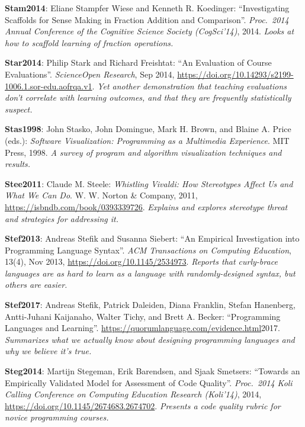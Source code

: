 \textbf{\hypertarget{b:Stam2014}{Stam2014}\label{b:Stam2014}}: Eliane Stampfer Wiese and Kenneth R. Koedinger: ``Investigating Scaffolds for Sense Making in Fraction Addition and Comparison''. \emph{Proc.\ 2014 Annual Conference of the Cognitive Science Society (CogSci'14)}, 2014. \emph{Looks at how to scaffold learning of fraction operations.}

\textbf{\hypertarget{b:Star2014}{Star2014}\label{b:Star2014}}: Philip Stark and Richard Freishtat: ``An Evaluation of Course Evaluations''. \emph{ScienceOpen Research}, Sep 2014, \url{https://doi.org/10.14293/s2199-1006.1.sor-edu.aofrqa.v1}. \emph{Yet another demonstration that teaching evaluations don't correlate with learning outcomes, and that they are frequently statistically suspect.}

\textbf{\hypertarget{b:Stas1998}{Stas1998}\label{b:Stas1998}}: John Stasko, John Domingue, Mark H. Brown, and Blaine A. Price (eds.): \emph{Software Visualization: Programming as a Multimedia Experience}. MIT Press, 1998. \emph{A survey of program and algorithm visualization techniques and results.}

\textbf{\hypertarget{b:Stee2011}{Stee2011}\label{b:Stee2011}}: Claude M. Steele: \emph{Whistling Vivaldi: How Stereotypes Affect Us and What We Can Do}. W. W. Norton \& Company, 2011, \url{https://isbndb.com/book/0393339726}. \emph{Explains and explores stereotype threat and strategies for addressing it.}

\textbf{\hypertarget{b:Stef2013}{Stef2013}\label{b:Stef2013}}: Andreas Stefik and Susanna Siebert: ``An Empirical Investigation into Programming Language Syntax''. \emph{ACM Transactions on Computing Education}, 13(4), Nov 2013, \url{https://doi.org/10.1145/2534973}. \emph{Reports that curly-brace languages are as hard to learn as a language with randomly-designed syntax, but others are easier.}

\textbf{\hypertarget{b:Stef2017}{Stef2017}\label{b:Stef2017}}: Andreas Stefik, Patrick Daleiden, Diana Franklin, Stefan Hanenberg, Antti-Juhani Kaijanaho, Walter Tichy, and Brett A. Becker: ``Programming Languages and Learning''. \url{https://quorumlanguage.com/evidence.html}2017. \emph{Summarizes what we actually know about designing programming languages and why we believe it's true.}

\textbf{\hypertarget{b:Steg2014}{Steg2014}\label{b:Steg2014}}: Martijn Stegeman, Erik Barendsen, and Sjaak Smetsers: ``Towards an Empirically Validated Model for Assessment of Code Quality''. \emph{Proc.\ 2014 Koli Calling Conference on Computing Education Research (Koli'14)}, 2014, \url{https://doi.org/10.1145/2674683.2674702}. \emph{Presents a code quality rubric for novice programming courses.}

